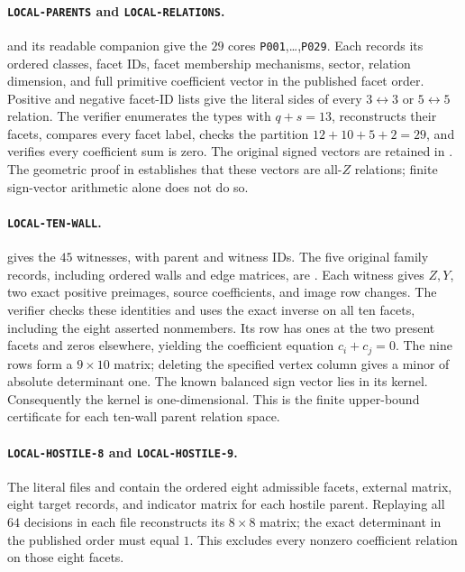 \documentclass[11pt]{article}
\newcommand{\1}{\mathbf 1}
\begin{document}
\paragraph{\texttt{LOCAL-PARENTS} and \texttt{LOCAL-RELATIONS}.}
 and its readable companion
 give the $29$ cores
\texttt{P001},\dots,\texttt{P029}.  Each records its ordered classes,
facet IDs, facet membership mechanisms, sector, relation dimension,
and full primitive coefficient vector in the published facet order.
Positive and negative facet-ID lists give the literal sides of every
$3\leftrightarrow3$ or $5\leftrightarrow5$ relation.
The verifier enumerates the types with $q+s=13$, reconstructs their
facets, compares every facet label, checks the partition $12+10+5+2=29$,
and verifies every coefficient sum is zero.  The original signed vectors
are retained in .
The geometric proof in  establishes that these vectors
are all-$Z$ relations; finite sign-vector arithmetic alone does not do so.

\paragraph{\texttt{LOCAL-TEN-WALL}.}
 gives the $45$ witnesses,
with parent and witness IDs.  The five original family records, including
ordered walls and edge matrices, are
.  Each witness gives
$Z,Y$, two exact positive preimages, source coefficients, and image row
changes.  The verifier checks these identities and uses the exact inverse
on all ten facets, including the eight asserted nonmembers.  Its row
has ones at the two present facets and zeros elsewhere, yielding the
coefficient equation $c_i+c_j=0$.  The nine rows form a $9\times10$
matrix; deleting the specified vertex column gives a minor of absolute
determinant one.  The known balanced sign vector lies in its kernel.
Consequently the kernel is one-dimensional.  This is the finite
upper-bound certificate for each ten-wall parent relation space.

\paragraph{\texttt{LOCAL-HOSTILE-8} and \texttt{LOCAL-HOSTILE-9}.}
The literal files  and
 contain the ordered eight
admissible facets, external matrix, eight target records, and indicator
matrix for each hostile parent.  Replaying all $64$ decisions in each
file reconstructs its $8\times8$ matrix; the exact determinant in the
published order must equal $1$.  This excludes every nonzero coefficient
relation on those eight facets.
\end{document}
